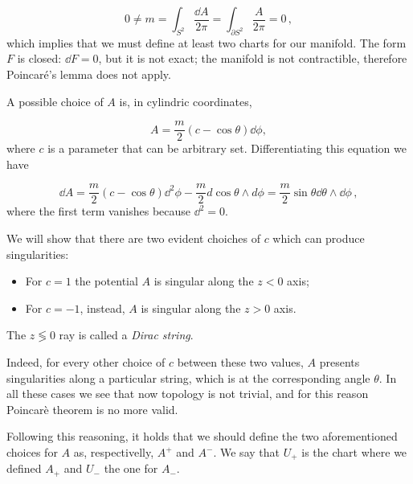\documentclass[main.tex]{subfiles}
\begin{document}
\begin{equation}
0\neq m=\int_{S^2}\frac{\dd{A}}{2\pi}=\int_{\partial S^2}\frac{A}{2\pi}=0\,,
\end{equation}
%
which implies that we must define at least two charts for our manifold.
The form \(F\) is closed: $\dd{F}=0$, but it is not exact; the manifold is not contractible, therefore Poincaré's lemma does not apply.


A possible choice of $A$ is, in cylindric coordinates,

\begin{equation}
A=\frac{m}{2}\left(c-\cos\theta\right)\dd{\phi},
\end{equation}
where $c$ is a parameter that can be arbitrary set. Differentiating this equation we have

\begin{equation}
\dd{A}=\frac{m}{2}\left(c-\cos\theta\right)\dd^2\phi-\frac{m}{2}d\cos\theta\wedge d \phi=\frac{m}{2}\sin\theta \dd{\theta}\wedge \dd{\phi}\,,
\end{equation}
where the first term vanishes because \(\dd^2 = 0\).

We will show that there are two evident choiches of $c$ which can produce singularities:

\begin{itemize}
\item For $c=1$ the potential \(A\) is singular along the \(z<0\) axis;
\item For $c=-1$, instead, \(A\) is singular along the \(z>0\) axis.
\end{itemize}

The \(z \lessgtr 0\) ray is called a \emph{Dirac string}.

Indeed, for every other choice of $c$ between these two values, $A$ presents singularities along a particular string, which is at the corresponding angle $\theta$.
In all these cases we see that now topology is not trivial, and for this reason Poincarè theorem is no more valid.

Following this reasoning, it holds that we should define the two aforementioned choices for $A$ as, respectivelly, $A^+$ and $A^-$. We say that $U_+$ is the chart where we defined $A_+$ and $U_-$ the one for $A_-$.
\end{document}
